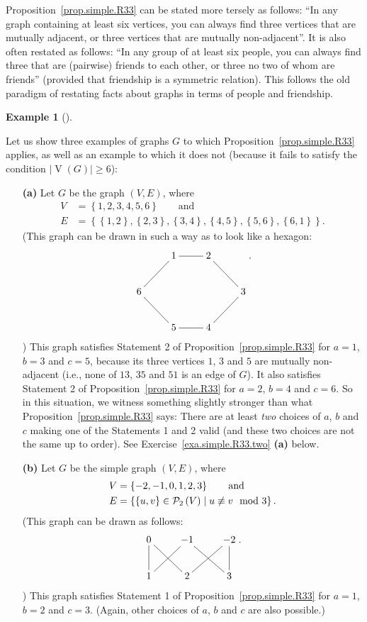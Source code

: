 \documentclass[numbers=enddot,12pt,final,onecolumn,notitlepage]{scrartcl}%
\makeatletter
\theoremstyle{definition}
\newtheorem{exam}[theo]{Example}
\newenvironment{example}[1][]
{\begin{exam}[#1]\begin{leftbar}}
{\end{leftbar}\end{exam}}
\newcommand{\powset}[2][]{\ifthenelse{\equal{#2}{}}{\mathcal{P}\left(#1\right)}{\mathcal{P}_{#1}\left(#2\right)}}
\newcommand{\set}[1]{\left\{ #1 \right\}}
\newcommand{\abs}[1]{\left| #1 \right|}
\newcommand{\tup}[1]{\left( #1 \right)}
\newcommand{\verts}[1]{\operatorname{V}\left( #1 \right)}
\newcommand{\are}{\ar@{-}}
\makeatother
\begin{document}
Proposition~\ref{prop.simple.R33} can be stated more tersely as
follows: ``In any graph containing at least six vertices, you can
always find three vertices that are mutually adjacent, or three
vertices that are mutually non-adjacent''. It is also often restated
as follows:
``In any group of at least six people, you can always find three that
are (pairwise) friends to each other, or three no two of whom are
friends'' (provided that friendship is a symmetric relation). This
follows the old paradigm of restating facts about graphs in terms of
people and friendship.

\begin{example} \label{exa.simple.R33}
Let us show three examples of graphs $G$ to which
Proposition~\ref{prop.simple.R33} applies, as well as an example to
which it does not (because it fails to satisfy the condition
$\abs{\verts{G}} \geq 6$):

\begin{enumerate}

\item[\textbf{(a)}] Let $G$ be the graph $\tup{V, E}$, where
\begin{align*}
V &= \set{1, 2, 3, 4, 5, 6} \qquad \text{and} \\
E &= \set{\set{1,2}, \set{2,3}, \set{3,4}, \set{4,5}, \set{5,6},
          \set{6,1}} .
\end{align*}
(This graph can be drawn in such a way as to look like a hexagon:
\begin{align*}
\xymatrix{
& 1 \are[r] & 2 \are[rd] \\
6 \are[ru] & & & 3 \are[ld] \\
& 5 \are[lu] & 4 \are[l]
} .
\end{align*}
)
This graph satisfies Statement 2 of Proposition~\ref{prop.simple.R33}
for $a=1$, $b=3$ and $c=5$,
because its three vertices $1$, $3$ and $5$ are mutually
non-adjacent (i.e., none of $13$, $35$ and $51$ is an edge of $G$).
It also satisfies Statement 2 of Proposition~\ref{prop.simple.R33}
for $a=2$, $b=4$ and $c=6$.
So in this situation, we witness something slightly stronger than what
Proposition~\ref{prop.simple.R33} says: There are at least
\textit{two} choices of $a$, $b$ and $c$ making one of the Statements
1 and 2 valid (and these two choices are not the same up to order).
See Exercise~\ref{exa.simple.R33.two} \textbf{(a)} below.

\item[\textbf{(b)}] Let $G$ be the simple graph $\tup{V, E}$, where
\begin{align*}
V &= \set{-2, -1, 0, 1, 2, 3} \qquad \text{and} \\
E &= \set{\set{u,v} \in \powset[2]{V} \mid u \not\equiv v \mod 3} .
\end{align*}
(This graph can be drawn as follows:
\begin{align*}
\xymatrix{
0 \are[d] \are[dr] & -1 \are[dl] \are[dr] & -2 \are[dl] \are[d] \\
1 & 2 & 3
} .
\end{align*}
)
This graph satisfies Statement 1 of Proposition~\ref{prop.simple.R33}
for $a=1$, $b=2$ and $c=3$. (Again, other choices of $a$, $b$ and $c$
are also possible.)


\end{enumerate}
\end{example}
\end{document}
